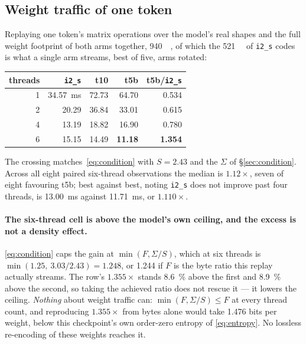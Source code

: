 \documentclass[11pt,a4paper]{article}
\newcommand{\code}[1]{\texttt{#1}}
\begin{document}
\subsection{Weight traffic of one token}\label{sec:traffic}
Replaying one token's matrix operations over the model's real shapes and the
full weight footprint of both arms together, \SI{940}{\mega\byte}, of which the
\SI{521}{\mega\byte} of \code{i2\_s} codes is what a single arm streams, best of
five, arms rotated:

\begin{center}
\begin{tabular}{rrrrr}
\toprule
threads & \code{i2\_s} & t10 & t5b & t5b/\code{i2\_s} \\
\midrule
1 & \SI{34.57}{\milli\second} & 72.73 & 64.70 & 0.534 \\
2 & 20.29 & 36.84 & 33.01 & 0.615 \\
4 & 13.19 & 18.82 & 16.90 & 0.780 \\
6 & 15.15 & 14.49 & \textbf{11.18} & \textbf{1.354} \\
\bottomrule
\end{tabular}
\end{center}

The crossing matches~\eqref{eq:condition} with $S=\num{2.43}$ and the $\Sigma$
of \S\ref{sec:condition}. Across all eight paired six-thread observations the
median is $1.12\times$, seven of eight favouring t5b; best against best, noting
\code{i2\_s} does not improve past four threads, is \SI{13.00}{\milli\second}
against \SI{11.71}{\milli\second}, or $\num{1.110}\times$.

\paragraph{The six-thread cell is above the model's own ceiling, and the excess
is not a density effect.} \eqref{eq:condition} caps the gain at
$\min(F,\Sigma/S)$, which at six threads is
$\min(\num{1.25},\ \num{3.03}/\num{2.43})=\num{1.248}$, or \num{1.244} if
$F$ is the byte ratio this replay actually streams. The row's
$\num{1.355}\times$ stands \SI{8.6}{\percent} above the first and
\SI{8.9}{\percent} above the second, so taking the achieved ratio does not
rescue it --- it lowers the ceiling. \emph{Nothing} about weight traffic can:
$\min(F,\Sigma/S)\le F$ at every thread count, and reproducing
$\num{1.355}\times$ from bytes alone would take \num{1.476} bits per weight,
below this checkpoint's own order-zero entropy of \eqref{eq:entropy}. No
lossless re-encoding of these weights reaches it.
\end{document}
